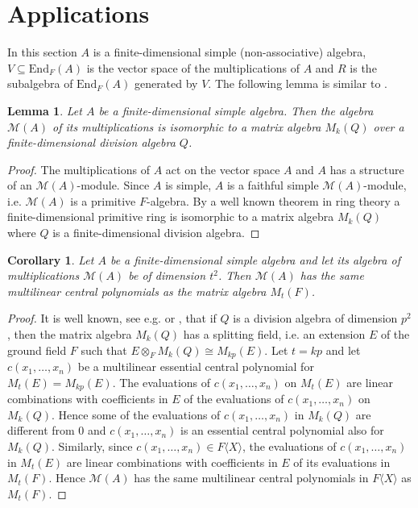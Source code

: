 \documentclass[10]{amsart}
\newtheorem{lemma}[theorem]{Lemma}
\newtheorem{corollary}[theorem]{Corollary}
\theoremstyle{definition}
\begin{document}
\section{Applications}
In this section $A$ is a finite-dimensional simple (non-associative) algebra, $V\subseteq \text{End}_F(A)$ is the vector space of the multiplications of $A$
and $R$ is the subalgebra of $\text{End}_F(A)$ generated by $V$. The following lemma is similar to \cite[Proposition 1.1]{PoS}.

\begin{lemma}\label{multiplication algebra of simple algebra}
Let $A$ be a finite-dimensional simple algebra. Then the algebra ${\mathcal M}(A)$ of its multiplications
is isomorphic to a matrix algebra $M_k(Q)$ over a finite-dimensional division algebra $Q$.
\end{lemma}

\begin{proof}
The multiplications of $A$ act on the vector space $A$ and $A$ has a structure of an ${\mathcal M}(A)$-module.
Since $A$ is simple, $A$ is a faithful simple ${\mathcal M}(A)$-module, i.e. ${\mathcal M}(A)$ is a primitive $F$-algebra.
By a well known theorem in ring theory \cite[page 33, Theorem 3]{J1}
a finite-dimensional primitive ring is isomorphic to a matrix algebra $M_k(Q)$ where $Q$ is a finite-dimensional division algebra.
\end{proof}

\begin{corollary}\label{central polynomials for multiplication algebra}
Let $A$ be a finite-dimensional simple algebra and let its algebra of multiplications ${\mathcal M}(A)$ be of dimension $t^2$.
Then ${\mathcal M}(A)$ has the same multilinear central polynomials
as the matrix algebra $M_t(F)$.
\end{corollary}

\begin{proof}
It is well known, see e.g. \cite[Theorem I]{W} or \cite[page 27, Theorem 1.6.17]{J3},
that if $Q$ is a division algebra of dimension $p^2$, then the matrix algebra $M_k(Q)$ has a splitting field, i.e. an extension $E$ of the ground field $F$
such that $E\otimes_FM_k(Q)\cong M_{kp}(E)$. Let $t=kp$ and let $c(x_1,\ldots,x_n)$ be a multilinear essential central polynomial for $M_t(E)=M_{kp}(E)$. The evaluations of $c(x_1,\ldots,x_n)$ on $M_t(E)$
are linear combinations with coefficients in $E$ of the evaluations of $c(x_1,\ldots,x_n)$ on $M_k(Q)$.
Hence some of the evaluations of $c(x_1,\ldots,x_n)$ in $M_k(Q)$ are different from 0 and $c(x_1,\ldots,x_n)$ is an essential central polynomial also for $M_k(Q)$.
Similarly, since $c(x_1,\ldots,x_n)\in F\langle X\rangle$, the evaluations of $c(x_1,\ldots,x_n)$ in $M_t(E)$ are linear combinations with coefficients in $E$ of its evaluations in $M_t(F)$.
Hence ${\mathcal M}(A)$ has the same multilinear central polynomials in $F\langle X\rangle$ as $M_t(F)$.
\end{proof}
\end{document}
